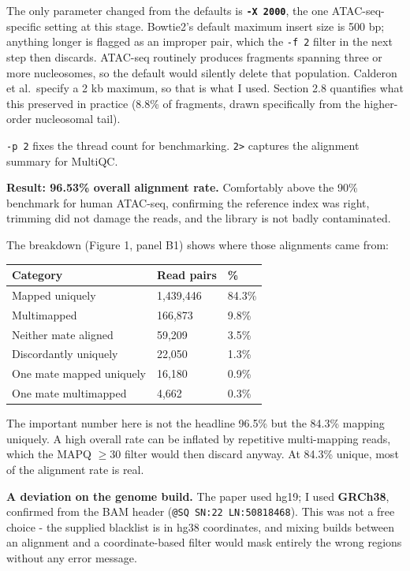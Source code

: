 \documentclass[
  11pt,
  a4paper,
]{article}
\begin{document}
The only parameter changed from the defaults is
\textbf{\texttt{-X\ 2000}}, the one ATAC-seq-specific setting at this
stage. Bowtie2's default maximum insert size is 500 bp; anything longer
is flagged as an improper pair, which the \texttt{-f\ 2} filter in the
next step then discards. ATAC-seq routinely produces fragments spanning
three or more nucleosomes, so the default would silently delete that
population. Calderon et al.~specify a 2 kb maximum, so that is what I
used. Section 2.8 quantifies what this preserved in practice (8.8\% of
fragments, drawn specifically from the higher-order nucleosomal tail).

\texttt{-p\ 2} fixes the thread count for benchmarking.
\texttt{2\textgreater{}} captures the alignment summary for MultiQC.

\textbf{Result: 96.53\% overall alignment rate.} Comfortably above the
90\% benchmark for human ATAC-seq, confirming the reference index was
right, trimming did not damage the reads, and the library is not badly
contaminated.

The breakdown (Figure 1, panel B1) shows where those alignments came
from:

\begin{longtable}[]{@{}lll@{}}
\toprule\noalign{}
Category & Read pairs & \% \\
\midrule\noalign{}
\endhead
\bottomrule\noalign{}
\endlastfoot
Mapped uniquely & 1,439,446 & 84.3\% \\
Multimapped & 166,873 & 9.8\% \\
Neither mate aligned & 59,209 & 3.5\% \\
Discordantly uniquely & 22,050 & 1.3\% \\
One mate mapped uniquely & 16,180 & 0.9\% \\
One mate multimapped & 4,662 & 0.3\% \\
\end{longtable}

The important number here is not the headline 96.5\% but the 84.3\%
mapping uniquely. A high overall rate can be inflated by repetitive
multi-mapping reads, which the MAPQ \(\geq 30\) filter would then
discard anyway. At 84.3\% unique, most of the alignment rate is real.

\textbf{A deviation on the genome build.} The paper used hg19; I used
\textbf{GRCh38}, confirmed from the BAM header
(\texttt{@SQ\ SN:22\ LN:50818468}). This was not a free choice - the
supplied blacklist is in hg38 coordinates, and mixing builds between an
alignment and a coordinate-based filter would mask entirely the wrong
regions without any error message.
\end{document}
